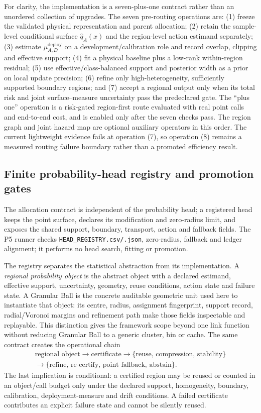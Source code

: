 \documentclass[11pt,a4paper]{article}
\numberwithin{equation}{section}
\theoremstyle{definition}\newtheorem{definition}[theorem]{Definition}
\theoremstyle{remark}\newtheorem{remark}[theorem]{Remark}
\begin{document}
For clarity, the implementation is a seven-plus-one contract rather than an unordered collection of upgrades. The seven pre-routing operations are: (1) freeze the validated physical representation and parent allocation; (2) retain the sample-level conditional surface $\widehat q_A(x)$ and the region-level action estimand separately; (3) estimate $\mu_{A,D}^{\mathrm{deploy}}$ on a development/calibration role and record overlap, clipping and effective support; (4) fit a physical baseline plus a low-rank within-region residual; (5) use effective/class-balanced support and posterior width as a prior on local update precision; (6) refine only high-heterogeneity, sufficiently supported boundary regions; and (7) accept a regional output only when its total risk and joint surface--measure uncertainty pass the predeclared gate. The ``plus one'' operation is a risk-gated region-first route evaluated with real point calls and end-to-end cost, and is enabled only after the seven checks pass. The region graph and joint hazard map are optional auxiliary operators in this order. The current lightweight evidence fails at operation (7), so operation (8) remains a measured routing failure boundary rather than a promoted efficiency result.

\subsection{Finite probability-head registry and promotion gates}
\label{sec:head_registry}
The allocation contract is independent of the probability head; a registered head keeps the point surface, declares its modification and zero-radius limit, and exposes the shared support, boundary, transport, action and fallback fields. The P5 runner checks \texttt{HEAD\_REGISTRY.csv/.json}, zero-radius, fallback and ledger alignment; it performs no head search, fitting or promotion.

The registry separates the statistical abstraction from its implementation. A \emph{regional probability object} is the abstract object with a declared estimand, effective support, uncertainty, geometry, reuse conditions, action state and failure state. A Granular Ball is the concrete auditable geometric unit used here to instantiate that object: its centre, radius, assignment fingerprint, support record, radial/Voronoi margins and refinement path make those fields inspectable and replayable. This distinction gives the framework scope beyond one link function without reducing Granular Ball to a generic cluster, bin or cache. The same contract creates the operational chain
\[
\begin{gathered}
\text{regional object}\longrightarrow\text{certificate}\longrightarrow
\{\text{reuse, compression, stability}\}\\
\longrightarrow\{\text{refine, re-certify, point fallback, abstain}\}.
\end{gathered}
\]
The last implication is conditional: a certified region may be reused or counted in an object/call budget only under the declared support, homogeneity, boundary, calibration, deployment-measure and drift conditions. A failed certificate contributes an explicit failure state and cannot be silently reused.
\end{document}
